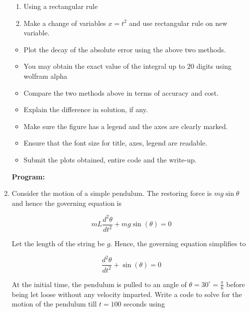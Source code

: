\documentclass[a4paper,11pt]{report}
\begin{document}
\begin{enumerate}
    \begin{enumerate}
    \item Using a rectangular rule
    \item Make a change of variables $x = t^{2}$ and use rectangular rule on new variable.
    \end{enumerate}

    \begin{itemize}
    \item Plot the decay of the absolute error using the above two methods.
    \item You may obtain the exact value of the integral up to $20$ digits using wolfram alpha
    \item Compare the two methods above in terms of accuracy and cost.
    \item Explain the difference in solution, if any.
    \item Make sure the figure has a legend and the axes are clearly marked.
    \item Ensure that the font size for title, axes, legend are readable.
    \item Submit the plots obtained, entire code and the write-up.
    \end{itemize}

    \textbf{Program:}
    

    \begin{figure}[ht!]
    \centering
    \resizebox{0.9\linewidth}{!}{}
    \end{figure}

    \item Consider the motion of a simple pendulum. The restoring force is $mg \sin \theta$
    and hence the governing equation is

    \begin{equation*}
    mL \frac{d^{2} \theta}{dt^{2}} + mg \sin(\theta) = 0
    \end{equation*}

    Let the length of the string be $g$. Hence, the governing equation simplifies to
                    
    \begin{equation*}
    \frac{d^{2} \theta}{dt^{2}} + \sin(\theta) = 0
    \end{equation*}

    At the initial time, the pendulum is pulled to an angle of $\theta = 30^{\circ} =
    \displaystyle \frac{\pi}{6}$
    before being let loose without any velocity imparted. Write a code to solve for the
    motion of the pendulum till $t = 100$ seconds using


\end{enumerate}
\end{document}
